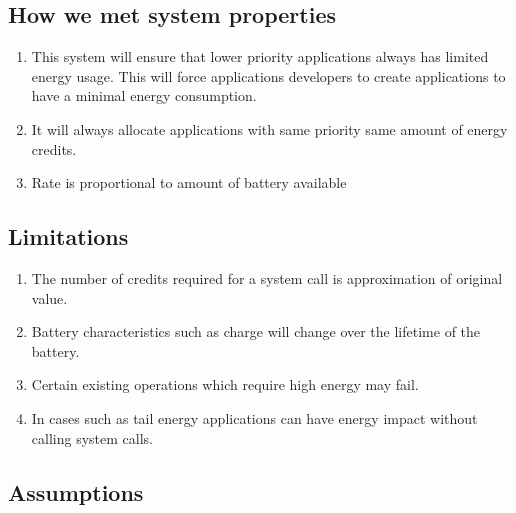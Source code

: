 \subsection{How we met system properties}

\begin{enumerate}


\item  This system will ensure that lower priority applications always has limited energy usage. This will force applications developers to create applications to have a minimal energy consumption. 

\item  It will always allocate applications with same priority same amount of energy credits.

\item  Rate is proportional to amount of battery available 

\end{enumerate}

\subsection{Limitations}

\begin{enumerate}

\item  The number of credits required for a system call is approximation of original value.
\item  Battery characteristics such as charge will change over the lifetime of the battery. 
\item  Certain existing operations which require high energy may fail.
\item  In cases such as tail energy applications can have energy impact without calling system calls.

\end{enumerate}

\subsection{Assumptions}

